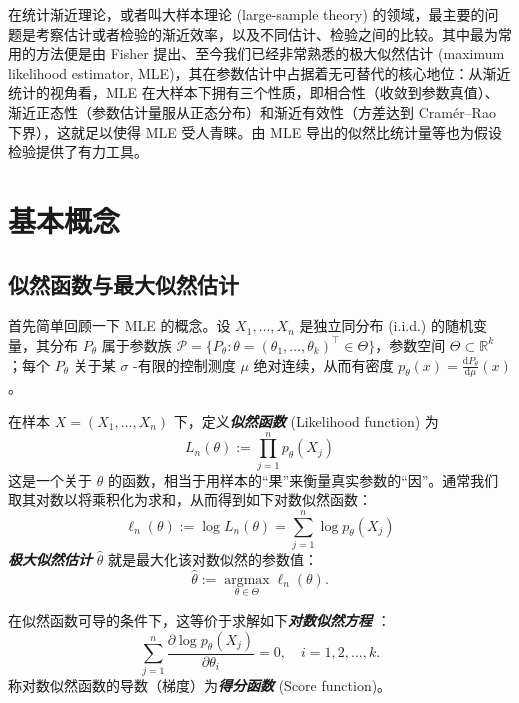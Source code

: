 在统计渐近理论，或者叫大样本理论 (large-sample theory) 的领域，最主要的问题是考察估计或者检验的渐近效率，以及不同估计、检验之间的比较。其中最为常用的方法便是由 Fisher 提出、至今我们已经非常熟悉的极大似然估计 (maximum likelihood estimator, MLE)，其在参数估计中占据着无可替代的核心地位：从渐近统计的视角看，MLE 在大样本下拥有三个性质，即相合性（收敛到参数真值）、渐近正态性（参数估计量服从正态分布）和渐近有效性（方差达到 Cram\'er--Rao 下界），这就足以使得 MLE 受人青睐。由 MLE 导出的似然比统计量等也为假设检验提供了有力工具。

\section{基本概念}

\subsection{似然函数与最大似然估计}

首先简单回顾一下 MLE 的概念。设 $X_1,\dots,X_n$ 是独立同分布 (i.i.d.) 的随机变量，其分布 $P_\theta$ 属于参数族 $\mathscr P=\{P_\theta:\theta=(\theta_1,\dots,\theta_k)^\top\in\Theta\}$，参数空间 $\Theta\subset\mathbb R^k$ ；每个 $P_\theta$ 关于某 $\sigma$ -有限的控制测度 $\mu$ 绝对连续，从而有密度 $p_\theta(x)=\tfrac{\mathrm dP_\theta}{\mathrm d\mu}(x)$。

在样本 $X=(X_1,\dots,X_n)$ 下，定义\textbf{\emph{似然函数}} (Likelihood function) 为
\[L_n(\theta) := \prod_{j=1}^n p_\theta(X_j)\]
这是一个关于 $\theta$ 的函数，相当于用样本的``果''来衡量真实参数的``因''。通常我们取其对数以将乘积化为求和，从而得到如下对数似然函数：
\[\ell_n(\theta):=\log L_n(\theta)=\sum_{j=1}^n\log p_\theta(X_j)\]
\textbf{\emph{极大似然估计}} $\widehat\theta$ 就是最大化该对数似然的参数值：
\[
\widehat\theta := \operatorname*{\arg\max}_{\theta\in\Theta}\ell_n(\theta).
\]

在似然函数可导的条件下，这等价于求解如下\textbf{\emph{对数似然方程}} ：
\[
\sum_{j=1}^n\frac{\partial\log p_\theta(X_j)}{\partial \theta_i}=0,\quad i=1,2,\dots,k.
\]
称对数似然函数的导数（梯度）为\textbf{\emph{得分函数}} (Score function)。




